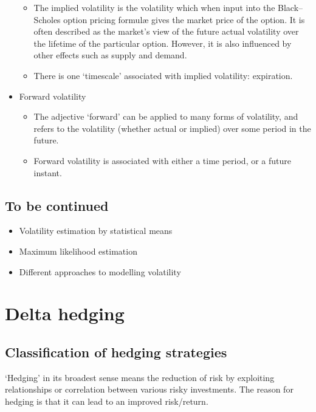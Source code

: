 \begin{itemize}
\begin{itemize}
		\setlength\itemsep{0em}
		\item The implied volatility is the volatility which when input into the Black–Scholes option pricing formul{\ae} gives the market price of the option. It is often described as the market's view of the future actual volatility over the lifetime of the particular option. However, it is also influenced by other effects such as supply and demand.
		\item There is one `timescale' associated with implied volatility: expiration.
	\end{itemize}
	\item Forward volatility
	\begin{itemize}
		\setlength\itemsep{0em}
		\item The adjective `forward' can be applied to many forms of volatility, and refers to the volatility (whether actual or implied) over some period in the future.
		\item Forward volatility is associated with either a time period, or a future instant.
	\end{itemize}
\end{itemize}



\subsection{To be continued}
\begin{itemize}
	\setlength\itemsep{0em}
	\item Volatility estimation by statistical means
	\item Maximum likelihood estimation
	\item Different approaches to modelling volatility
\end{itemize}



\section{Delta hedging}

\subsection{Classification of hedging strategies}
`Hedging' in its broadest sense means the reduction of risk by exploiting relationships or correlation between various risky investments. The reason for hedging is that it can lead to an improved risk/return. 


